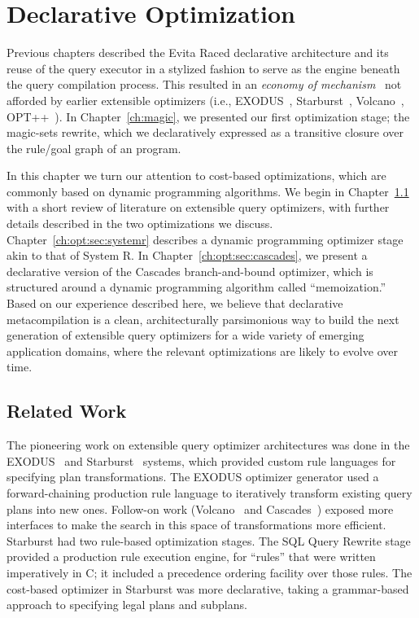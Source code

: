 \chapter[Declarative Optimization]{Declarative Optimization}
\label{ch:opt}

Previous chapters described the Evita Raced declarative architecture and its
reuse of the query executor in a stylized fashion to serve as the engine
beneath the query compilation process.  This resulted in an {\em economy of
mechanism}~\cite{Saltzer75theprotection} not afforded by earlier extensible
optimizers (i.e., EXODUS~\cite{exodus}, Starburst~\cite{phh92},
Volcano~\cite{volcano}, OPT++~\cite{opt++}).  In Chapter~\ref{ch:magic}, we
presented our first optimization stage; the magic-sets rewrite, which we
declaratively expressed as a transitive closure over the rule/goal graph of an
\OVERLOG program.

In this chapter we turn our attention to cost-based optimizations, which are
commonly based on dynamic programming algorithms.  We begin in
Chapter~\ref{ch:opt:sec:related} with a short review of literature on
extensible query optimizers, with further details described in the two
optimizations we discuss.  Chapter~\ref{ch:opt:sec:systemr} describes a dynamic
programming optimizer stage akin to that of System R.  In
Chapter~\ref{ch:opt:sec:cascades}, we present a declarative version of the
Cascades branch-and-bound optimizer, which is structured around a dynamic
programming algorithm called ``memoization.'' Based on our experience described
here, we believe that declarative metacompilation is a clean, architecturally
parsimonious way to build the next generation of extensible query optimizers
for a wide variety of emerging application domains, where the relevant
optimizations are likely to evolve over time.

\section{Related Work}
\label{ch:opt:sec:related}

The pioneering work on extensible query optimizer architectures was done in the
EXODUS~\cite{exodus} and Starburst~\cite{lohman,phh92} systems, which provided
custom rule languages for specifying plan transformations.  The EXODUS
optimizer generator used a forward-chaining production rule language to iteratively
transform existing query plans into new ones.  Follow-on work
(Volcano~\cite{volcano} and Cascades~\cite{cascades}) exposed more interfaces
to make the search in this space of transformations more efficient.  Starburst
had two rule-based optimization stages.  The SQL Query Rewrite stage provided a
production rule execution engine, for ``rules'' that were written imperatively
in C; it included a precedence ordering facility over those rules.  The
cost-based optimizer in Starburst was more declarative, taking a grammar-based
approach to specifying legal plans and subplans.

